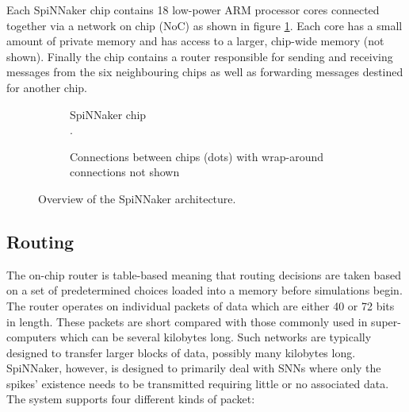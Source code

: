 			Each SpiNNaker chip contains 18 low-power ARM processor cores connected
			together via a network on chip (NoC) as shown in figure
			\ref{fig:spinnaker-chip}. Each core has a small amount of private memory
			and has access to a larger, chip-wide memory (not shown). Finally the chip
			contains a router responsible for sending and receiving messages from the
			six neighbouring chips as well as forwarding messages destined for another
			chip.
			
			
			\begin{figure}
				\center
				\begin{subfigure}[b]{0.49\textwidth}
					\center
					
					\caption{SpiNNaker chip\\\color{white}.}
					\label{fig:spinnaker-chip}
				\end{subfigure}
				\begin{subfigure}[b]{0.49\textwidth}
					\center
					
					\caption{Connections between chips (dots) with wrap-around
					connections not shown}
					\label{fig:spinnaker-chips}
				\end{subfigure}
				
				\caption{Overview of the SpiNNaker architecture.}
				\label{fig:spinnaker-architecture}
			\end{figure}
		
		\subsection{Routing}
			
			
			The on-chip router is table-based meaning that routing decisions are taken
			based on a set of predetermined choices loaded into a memory before
			simulations begin. The router operates on individual packets of data which
			are either 40 or 72 bits in length. These packets are short compared with
			those commonly used in super-computers which can be several kilobytes
			long.  Such networks are typically designed to transfer larger blocks of
			data, possibly many kilobytes long. SpiNNaker, however, is designed to
			primarily deal with SNNs where only the spikes' existence needs to be
			transmitted requiring little or no associated data.  The system supports
			four different kinds of packet:
			
